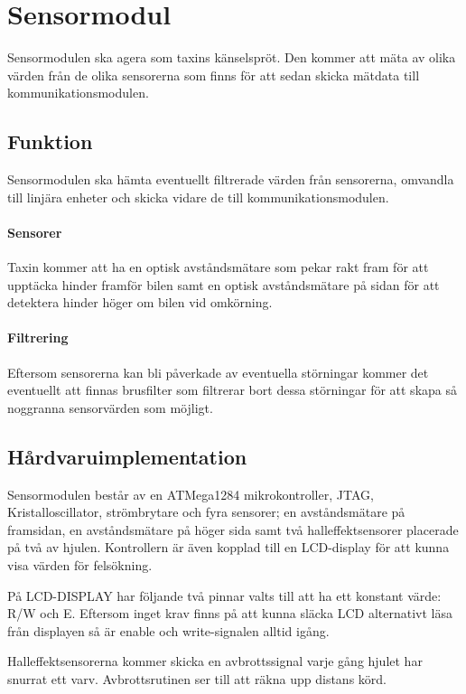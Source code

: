 \documentclass[designspec/spec.tex]{subfiles}
\begin{document}
\section{Sensormodul}
Sensormodulen ska agera som taxins känselspröt. Den kommer att mäta av olika
värden från de olika sensorerna som finns för att sedan skicka mätdata till
kommunikationsmodulen.

\subsection{Funktion}
Sensormodulen ska hämta eventuellt filtrerade värden från sensorerna, omvandla
till linjära enheter och skicka vidare de till kommunikationsmodulen.

\paragraph{Sensorer}
Taxin kommer att ha en optisk avståndsmätare som pekar rakt fram för att
upptäcka hinder framför bilen samt en optisk avståndsmätare på sidan för att
detektera hinder höger om bilen vid omkörning.

\paragraph{Filtrering} Eftersom sensorerna kan bli påverkade av eventuella
störningar kommer det eventuellt att finnas brusfilter som filtrerar bort dessa
störningar för att skapa så noggranna sensorvärden som möjligt.

\subsection{Hårdvaruimplementation} Sensormodulen består av en ATMega1284
mikrokontroller, JTAG, Kristalloscillator, strömbrytare och fyra sensorer; en
avståndsmätare på framsidan, en avståndsmätare på höger sida samt två
halleffektsensorer placerade på två av hjulen. Kontrollern är även kopplad till
en LCD-display för att kunna visa värden för felsökning.

På LCD-DISPLAY har följande två pinnar valts till att ha ett konstant värde:
R/W och E. Eftersom inget krav finns på att kunna släcka LCD alternativt läsa
från displayen så är enable och write-signalen alltid igång.

Halleffektsensorerna kommer skicka en avbrottssignal varje gång hjulet har
snurrat ett varv. Avbrottsrutinen ser till att räkna upp distans körd.
\end{document}
